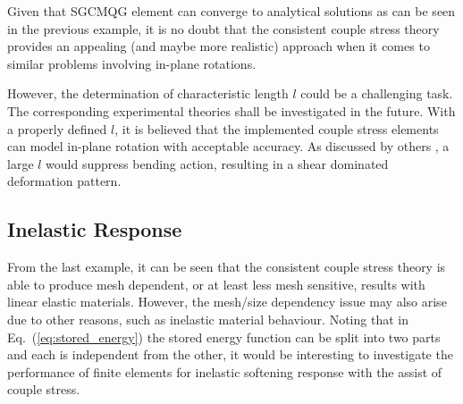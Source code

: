 \documentclass[3p,sort&compress,11pt,fleqn,review]{elsarticle}
\newcommand*{\eqsref}[1]{Eq.~(\ref{#1})}
\begin{document}
Given that SGCMQG element can converge to analytical solutions as can be seen in the previous example, it is no doubt that the consistent couple stress theory provides an appealing (and maybe more realistic) approach when it comes to similar problems involving in-plane rotations.

However, the determination of characteristic length $l$ could be a challenging task. The corresponding experimental theories shall be investigated in the future. With a properly defined $l$, it is believed that the implemented couple stress elements can model in-plane rotation with acceptable accuracy. As discussed by others \citep[e.g.,][]{Darrall2013}, a large $l$ would suppress bending action, resulting in a shear dominated deformation pattern.
\subsection{Inelastic Response}
\alert{From the last example, it can be seen that the consistent couple stress theory is able to produce mesh dependent, or at least less mesh sensitive, results with linear elastic materials. However, the mesh/size dependency issue may also arise due to other reasons, such as inelastic material behaviour.} Noting that in \eqsref{eq:stored_energy} the stored energy function can be split into two parts and each is independent from the other, it would be interesting to investigate the performance of finite elements for inelastic softening response with the assist of couple stress.
\end{document}
